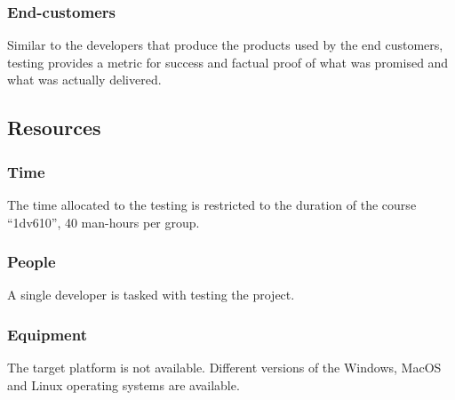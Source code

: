 \subsubsection{End-customers}
Similar to the developers that produce the products used by the end customers,
testing provides a metric for success and factual proof of what was promised
and what was actually delivered.

\subsection{Resources}
\subsubsection{Time}
The time allocated to the testing is restricted to the duration of the course
``1dv610'', 40 man-hours per group.

\subsubsection{People}
A single developer is tasked with testing the project. 

\subsubsection{Equipment}
The target platform is not available. Different versions of the Windows, MacOS
and Linux operating systems are available.
